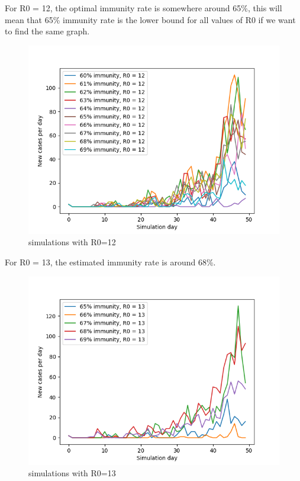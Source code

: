 \documentclass[runningheads]{llncs}
\begin{document}
\newpage
\noindent
For R0 = 12, the optimal immunity rate is somewhere around 65\%, this will mean that 65\% immunity rate is the lower bound for all values of R0 if we want to find the same graph.
\begin{figure}
	\includegraphics[width=\textwidth]{test_R0_12.png}
	\caption{simulations with R0=12}
\end{figure}

\newpage
\noindent
For R0 = 13, the estimated immunity rate is around 68\%.
\begin{figure}
	\includegraphics[width=\textwidth]{test_R0_13.png}
	\caption{simulations with R0=13}
\end{figure}
\end{document}
